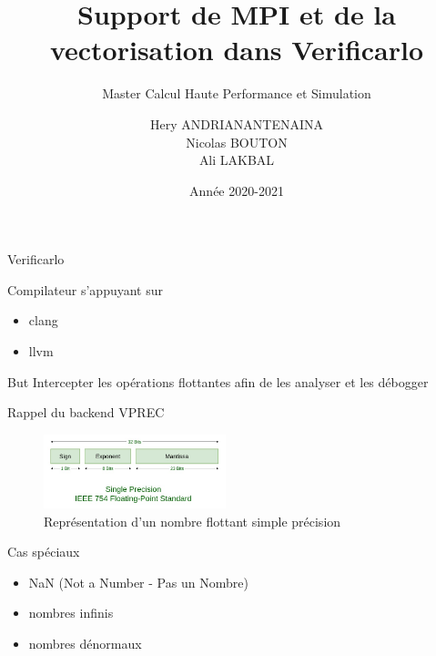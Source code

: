 \documentclass{beamer}
\title[Support pour Verificarlo]{Support de MPI et de la vectorisation dans Verificarlo}
\subtitle{Master Calcul Haute Performance et Simulation}
\author[Hery, Nicolas, Ali]{Hery ANDRIANANTENAINA \\ Nicolas BOUTON \\ Ali LAKBAL}
\institute[]{\textbf{Encadrant:} Eric PETIT}
\date{Année 2020-2021}
\begin{document}
\maketitle

\begin{frame}{Verificarlo}

  \begin{block}{Compilateur s'appuyant sur}
    \begin{itemize}
    \item clang
    \item llvm
    \end{itemize}
  \end{block}

  \begin{block}{But}
    Intercepter les opérations flottantes afin de les analyser et les débogger
  \end{block}
  
\end{frame}

\begin{frame}{Rappel du backend VPREC}

  \begin{figure}
    \centering
    \includegraphics[width=200px]{../ressources/ieee754_floating-point_single_precision.jpg}
    \caption{\label{fig:ieee754_single_precision}Représentation d'un nombre flottant simple précision}
  \end{figure}

  \begin{block}{Cas spéciaux}
    \begin{itemize}
    \item NaN (Not a Number - Pas un Nombre)
    \item nombres infinis
    \item nombres dénormaux
    \end{itemize}
  \end{block}

\end{frame}
\end{document}

